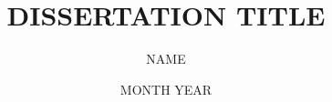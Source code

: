 \documentclass[letterpaper, 12pt]{yalephd}
\begin{document}
	
	
\title{DISSERTATION TITLE}
\author{NAME}
\date{MONTH YEAR}

\frontmatter



\maketitle
{} %


\setcounter{page}{3}

\tableofcontents

\listoffigures
\listoftables



\newpage

\mainmatter













\newpage
\appendix



\backmatter


% 


%	
\end{document}
